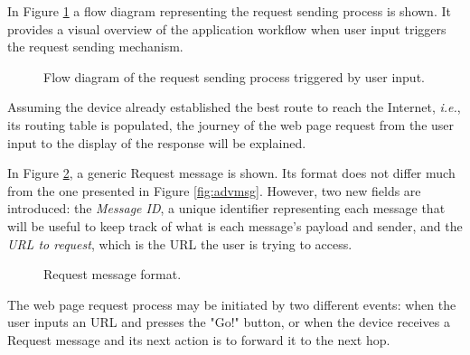 In Figure \ref{fig:rqtflux} a flow diagram representing the request sending process is shown. It provides a visual overview of the application workflow when user input triggers the request sending mechanism.

\begin{figure}[ht]
	\noindent{}
	\caption{\label{fig:rqtflux} Flow diagram of the request sending process triggered by user input.}
\end{figure}

Assuming the device already established the best route to reach the Internet, \textit{i.e.}, its routing table is populated, the journey of the web page request from the user input to the display of the response will be explained.

In Figure \ref{fig:rqtmsg}, a generic Request message is shown. Its format does not differ much from the one presented in Figure \ref{fig:advmsg}. However, two new fields are introduced: the \textit{Message ID}, a unique identifier representing each message that will be useful to keep track of what is each message's payload and sender, and the \textit{\gls{URL} to request}, which is the \gls{URL} the user is trying to access.

\begin{figure}[ht]
	\noindent{}
	\caption{\label{fig:rqtmsg} Request message format.}
\end{figure}

The web page request process may be initiated by two different events: when the user inputs an \gls{URL} and presses the "Go!" button, or when the device receives a Request message and its next action is to forward it to the next hop.

